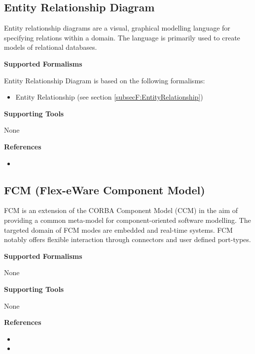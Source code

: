 \subsection{Entity Relationship Diagram}
\label{subsecL:ERD}


Entity relationship diagrams are a visual, graphical modelling language for specifying relations within a domain. The language is primarily used to create models of relational databases.

\textbf{Supported Formalisms}

Entity Relationship Diagram is based on the following formalisms:
\begin{itemize}
	\item Entity Relationship (see section \ref{subsecF:EntityRelationship})
\end{itemize}


\textbf{Supporting Tools}

None


\textbf{References}
\begin{itemize}
	
\item {}
\end{itemize}



\subsection{FCM (Flex-eWare Component Model)}
\label{subsecL:FCM}


FCM is an extension of the CORBA Component Model (CCM) in the aim of providing a common meta-model for component-oriented software modelling. The targeted domain of FCM modes are embedded and real-time systems. FCM notably offers flexible interaction through connectors and user defined port-types.

\textbf{Supported Formalisms}

None


\textbf{Supporting Tools}

None


\textbf{References}
\begin{itemize}
	
\item {}
	
\item {}
\end{itemize}



